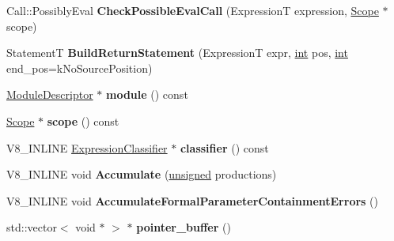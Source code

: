 \begin{DoxyCompactItemize}
Call\+::\+Possibly\+Eval {\bfseries Check\+Possible\+Eval\+Call} (ExpressionT expression, \mbox{\hyperlink{classv8_1_1internal_1_1Scope}{Scope}} $\ast$scope)
\item 
\mbox{\label{classv8_1_1internal_1_1ParserBase_a684ac6ee75dafac92686b0d5f3244f88}} 
StatementT {\bfseries Build\+Return\+Statement} (ExpressionT expr, \mbox{\hyperlink{classint}{int}} pos, \mbox{\hyperlink{classint}{int}} end\+\_\+pos=k\+No\+Source\+Position)
\item 
\mbox{\label{classv8_1_1internal_1_1ParserBase_adcd7c412a075fde25ad20f948cc046af}} 
\mbox{\hyperlink{classv8_1_1internal_1_1ModuleDescriptor}{Module\+Descriptor}} $\ast$ {\bfseries module} () const
\item 
\mbox{\label{classv8_1_1internal_1_1ParserBase_aa06682ced2fc908aa8b000a7aab4ceea}} 
\mbox{\hyperlink{classv8_1_1internal_1_1Scope}{Scope}} $\ast$ {\bfseries scope} () const
\item 
\mbox{\label{classv8_1_1internal_1_1ParserBase_a1d0ae5317bd2a68a2f37e49589cd5659}} 
V8\+\_\+\+I\+N\+L\+I\+NE \mbox{\hyperlink{classv8_1_1internal_1_1ExpressionClassifier}{Expression\+Classifier}} $\ast$ {\bfseries classifier} () const
\item 
\mbox{\label{classv8_1_1internal_1_1ParserBase_ae256bfd0da4233fea8108be5ce2f8332}} 
V8\+\_\+\+I\+N\+L\+I\+NE void {\bfseries Accumulate} (\mbox{\hyperlink{classunsigned}{unsigned}} productions)
\item 
\mbox{\label{classv8_1_1internal_1_1ParserBase_a9d7e4361cf5a640c712ebc67f74e709f}} 
V8\+\_\+\+I\+N\+L\+I\+NE void {\bfseries Accumulate\+Formal\+Parameter\+Containment\+Errors} ()
\item 
\mbox{\label{classv8_1_1internal_1_1ParserBase_a277cb7431e542ae75406d0e1e6c7249f}} 
std\+::vector$<$ void $\ast$ $>$ $\ast$ {\bfseries pointer\+\_\+buffer} ()
\end{DoxyCompactItemize}
